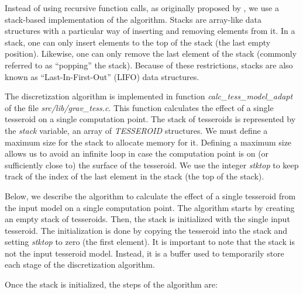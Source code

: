 Instead of using recursive function calls,
as originally proposed by \citet{li2011},
we use a stack-based implementation of the algorithm.
Stacks are array-like data structures
with a particular way of inserting and removing elements from it.
In a stack,
one can only insert elements to the top of the stack
(the last empty position).
Likewise,
one can only remove the last element of the stack
(commonly referred to as ``popping'' the stack).
Because of these restrictions,
stacks are also known as ``Last-In-First-Out'' (LIFO) data structures.

The discretization algorithm is implemented in
function \emph{calc\_tess\_model\_adapt}
of the file \emph{src/lib/grav\_tess.c}.
This function calculates the effect of a single tesseroid
on a single computation point.
The stack of tesseroids is represented by
the \emph{stack} variable,
an array of \emph{TESSEROID} structures.
We must define a maximum size for the stack to allocate memory for it.
Defining a maximum size allows us to
avoid an infinite loop
in case the computation point is on
(or sufficiently close to) the surface of the tesseroid.
We use the integer \emph{stktop}
to keep track of the index of
the last element in the stack (the top of the stack).

Below, we describe the algorithm to calculate
the effect of a single tesseroid from the input model
on a single computation point.
The algorithm starts by creating an empty stack of tesseroids.
Then, the stack is initialized with the single input tesseroid.
The initialization is done by copying the tesseroid into the stack
and setting \emph{stktop} to zero (the first element).
It is important to note that the stack is not the input tesseroid model.
Instead, it is a buffer used to temporarily store
each stage of the discretization algorithm.

Once the stack is initialized, the steps of the algorithm are:

